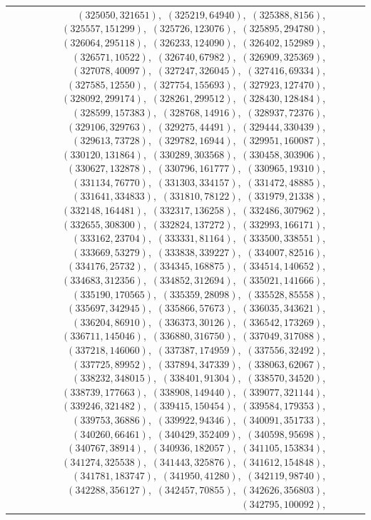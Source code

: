\documentclass[11pt]{article}
\begin{document}
\begin{longtable}{@{}rrl>{\raggedright\arraybackslash}p{}@{}}
$(325050,321651)$,\allowbreak\ $(325219,64940)$,\allowbreak\ $(325388,8156)$,\allowbreak\ $(325557,151299)$,\allowbreak\ $(325726,123076)$,\allowbreak\ $(325895,294780)$,\allowbreak\ $(326064,295118)$,\allowbreak\ $(326233,124090)$,\allowbreak\ $(326402,152989)$,\allowbreak\ $(326571,10522)$,\allowbreak\ $(326740,67982)$,\allowbreak\ $(326909,325369)$,\allowbreak\ $(327078,40097)$,\allowbreak\ $(327247,326045)$,\allowbreak\ $(327416,69334)$,\allowbreak\ $(327585,12550)$,\allowbreak\ $(327754,155693)$,\allowbreak\ $(327923,127470)$,\allowbreak\ $(328092,299174)$,\allowbreak\ $(328261,299512)$,\allowbreak\ $(328430,128484)$,\allowbreak\ $(328599,157383)$,\allowbreak\ $(328768,14916)$,\allowbreak\ $(328937,72376)$,\allowbreak\ $(329106,329763)$,\allowbreak\ $(329275,44491)$,\allowbreak\ $(329444,330439)$,\allowbreak\ $(329613,73728)$,\allowbreak\ $(329782,16944)$,\allowbreak\ $(329951,160087)$,\allowbreak\ $(330120,131864)$,\allowbreak\ $(330289,303568)$,\allowbreak\ $(330458,303906)$,\allowbreak\ $(330627,132878)$,\allowbreak\ $(330796,161777)$,\allowbreak\ $(330965,19310)$,\allowbreak\ $(331134,76770)$,\allowbreak\ $(331303,334157)$,\allowbreak\ $(331472,48885)$,\allowbreak\ $(331641,334833)$,\allowbreak\ $(331810,78122)$,\allowbreak\ $(331979,21338)$,\allowbreak\ $(332148,164481)$,\allowbreak\ $(332317,136258)$,\allowbreak\ $(332486,307962)$,\allowbreak\ $(332655,308300)$,\allowbreak\ $(332824,137272)$,\allowbreak\ $(332993,166171)$,\allowbreak\ $(333162,23704)$,\allowbreak\ $(333331,81164)$,\allowbreak\ $(333500,338551)$,\allowbreak\ $(333669,53279)$,\allowbreak\ $(333838,339227)$,\allowbreak\ $(334007,82516)$,\allowbreak\ $(334176,25732)$,\allowbreak\ $(334345,168875)$,\allowbreak\ $(334514,140652)$,\allowbreak\ $(334683,312356)$,\allowbreak\ $(334852,312694)$,\allowbreak\ $(335021,141666)$,\allowbreak\ $(335190,170565)$,\allowbreak\ $(335359,28098)$,\allowbreak\ $(335528,85558)$,\allowbreak\ $(335697,342945)$,\allowbreak\ $(335866,57673)$,\allowbreak\ $(336035,343621)$,\allowbreak\ $(336204,86910)$,\allowbreak\ $(336373,30126)$,\allowbreak\ $(336542,173269)$,\allowbreak\ $(336711,145046)$,\allowbreak\ $(336880,316750)$,\allowbreak\ $(337049,317088)$,\allowbreak\ $(337218,146060)$,\allowbreak\ $(337387,174959)$,\allowbreak\ $(337556,32492)$,\allowbreak\ $(337725,89952)$,\allowbreak\ $(337894,347339)$,\allowbreak\ $(338063,62067)$,\allowbreak\ $(338232,348015)$,\allowbreak\ $(338401,91304)$,\allowbreak\ $(338570,34520)$,\allowbreak\ $(338739,177663)$,\allowbreak\ $(338908,149440)$,\allowbreak\ $(339077,321144)$,\allowbreak\ $(339246,321482)$,\allowbreak\ $(339415,150454)$,\allowbreak\ $(339584,179353)$,\allowbreak\ $(339753,36886)$,\allowbreak\ $(339922,94346)$,\allowbreak\ $(340091,351733)$,\allowbreak\ $(340260,66461)$,\allowbreak\ $(340429,352409)$,\allowbreak\ $(340598,95698)$,\allowbreak\ $(340767,38914)$,\allowbreak\ $(340936,182057)$,\allowbreak\ $(341105,153834)$,\allowbreak\ $(341274,325538)$,\allowbreak\ $(341443,325876)$,\allowbreak\ $(341612,154848)$,\allowbreak\ $(341781,183747)$,\allowbreak\ $(341950,41280)$,\allowbreak\ $(342119,98740)$,\allowbreak\ $(342288,356127)$,\allowbreak\ $(342457,70855)$,\allowbreak\ $(342626,356803)$,\allowbreak\ $(342795,100092)$,\allowbreak\ 
\end{longtable}
\end{document}
